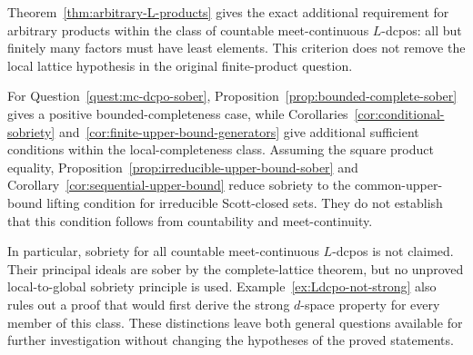 \documentclass[11pt,reqno]{amsart}
\theoremstyle{definition}
\theoremstyle{remark}
\numberwithin{equation}{section}
\begin{document}
Theorem~\ref{thm:arbitrary-L-products} gives the exact additional requirement for arbitrary products within the class of countable meet-continuous $L$-dcpos: all but finitely many factors must have least elements. This criterion does not remove the local lattice hypothesis in the original finite-product question.

For Question~\ref{quest:mc-dcpo-sober}, Proposition~\ref{prop:bounded-complete-sober} gives a positive bounded-completeness case, while Corollaries~\ref{cor:conditional-sobriety} and~\ref{cor:finite-upper-bound-generators} give additional sufficient conditions within the local-completeness class. Assuming the square product equality, Proposition~\ref{prop:irreducible-upper-bound-sober} and Corollary~\ref{cor:sequential-upper-bound} reduce sobriety to the common-upper-bound lifting condition for irreducible Scott-closed sets. They do not establish that this condition follows from countability and meet-continuity.

In particular, sobriety for all countable meet-continuous $L$-dcpos is not claimed. Their principal ideals are sober by the complete-lattice theorem, but no unproved local-to-global sobriety principle is used. Example~\ref{ex:Ldcpo-not-strong} also rules out a proof that would first derive the strong $d$-space property for every member of this class. These distinctions leave both general questions available for further investigation without changing the hypotheses of the proved statements.
\end{document}
